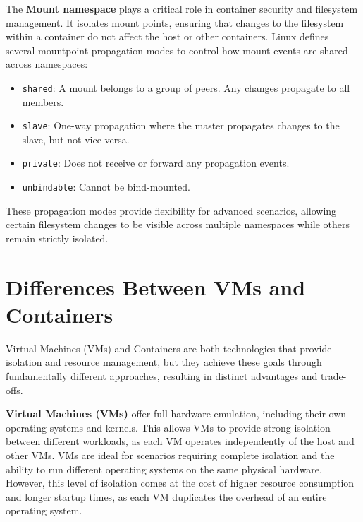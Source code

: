 The \textbf{Mount namespace} plays a critical role in container security and filesystem management. It isolates mount points, ensuring that changes to the filesystem within a container do not affect the host or other containers. Linux defines several mountpoint propagation modes to control how mount events are shared across namespaces:
\begin{itemize}
    \item \texttt{shared}: A mount belongs to a group of peers. Any changes propagate to all members.
    \item \texttt{slave}: One-way propagation where the master propagates changes to the slave, but not vice versa.
    \item \texttt{private}: Does not receive or forward any propagation events.
    \item \texttt{unbindable}: Cannot be bind-mounted.
\end{itemize}

These propagation modes provide flexibility for advanced scenarios, allowing certain filesystem changes to be visible across multiple namespaces while others remain strictly isolated.

\section{Differences Between VMs and Containers}

Virtual Machines (VMs) and Containers are both technologies that provide isolation and resource management, but they achieve these goals through fundamentally different approaches, resulting in distinct advantages and trade-offs.


\textbf{Virtual Machines (VMs)} offer full hardware emulation, including their own operating systems and kernels. This allows VMs to provide strong isolation between different workloads, as each VM operates independently of the host and other VMs. VMs are ideal for scenarios requiring complete isolation and the ability to run different operating systems on the same physical hardware. However, this level of isolation comes at the cost of higher resource consumption and longer startup times, as each VM duplicates the overhead of an entire operating system.


